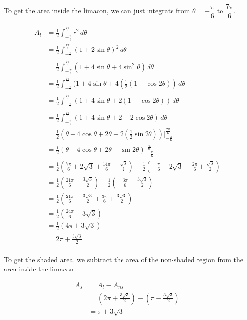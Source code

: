 To get the area inside the limacon, we can just integrate from $\theta = -\dfrac{\pi}{6}$ to $\dfrac{7\pi}{6}$.

\begin{align*}
A_{l} &= \frac{1}{2} \int_{-\frac{\pi}{6}}^{\frac{7\pi}{6}} r^2 \, d\theta \\ 
&= \frac{1}{2} \int_{-\frac{\pi}{6}}^{\frac{7\pi}{6}} (1 + 2 \sin \theta)^2 \, d\theta \\
&= \frac{1}{2} \int_{-\frac{\pi}{6}}^{\frac{7\pi}{6}} (1 + 4 \sin \theta + 4 \sin ^2 \theta) \, d\theta \\
&= \frac{1}{2} \int_{-\frac{\pi}{6}}^{\frac{7\pi}{6}} (1 + 4 \sin \theta + 4(\frac{1}{2}(1 - \cos 2\theta)) \, d\theta \\
&= \frac{1}{2} \int_{-\frac{\pi}{6}}^{\frac{7\pi}{6}} (1 + 4 \sin \theta + 2(1 - \cos 2\theta)) \, d\theta \\
&= \frac{1}{2} \int_{-\frac{\pi}{6}}^{\frac{7\pi}{6}} (1 + 4 \sin \theta + 2 - 2\cos 2\theta) \, d\theta \\
&= \frac{1}{2} \left(\theta - 4 \cos \theta + 2\theta - 2 (\frac{1}{2} \sin 2\theta) \right) \Bigg|_{-\frac{\pi}{6}}^{\frac{7\pi}{6}} \\ 
&= \frac{1}{2} \left(\theta - 4 \cos \theta + 2\theta - \sin 2\theta \right) \Bigg|_{-\frac{\pi}{6}}^{\frac{7\pi}{6}} \\
&= \frac{1}{2} \left(\frac{7\pi}{6} + 2\sqrt3 + \frac{14\pi}{6} - \frac{\sqrt 3}{2} \right) - \frac{1}{2} \left(- \frac{\pi}{6} - 2\sqrt3 - \frac{2\pi}{6} + \frac{\sqrt 3}{2} \right) \\
&= \frac{1}{2} \left(\frac{21\pi}{6} + \frac{3\sqrt 3}{2} \right) - \frac{1}{2} \left(-\frac{3\pi}{6} - \frac{3\sqrt 3}{2} \right) \\ 
&= \frac{1}{2} \left(\frac{21\pi}{6} + \frac{3\sqrt 3}{2} + \frac{3\pi}{6} + \frac{3\sqrt 3}{2} \right) \\ 
&= \frac{1}{2} \left(\frac{24\pi}{6} + 3 \sqrt 3 \right) \\ 
&= \frac{1}{2} \left(4\pi + 3 \sqrt 3 \right) \\ 
&= 2\pi + \frac{3 \sqrt 3}{2} \\ 
\end{align*}

To get the shaded area, we subtract the area of the non-shaded region from the area inside the limacon.

\begin{align*}
A_s &= A_l - A_{ns} \\
&= \left(2\pi + \frac{3 \sqrt 3}{2}\right) - \left(\pi - \frac{3 \sqrt 3}{2}\right) \\
&= \boxed{\pi + 3 \sqrt 3}
\end{align*}
